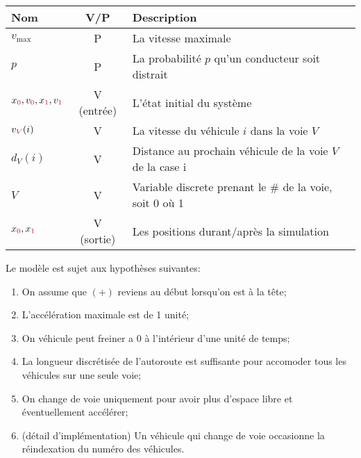 \documentclass[12pt,leqno]{article}
\newcommand\modif{\color{purple}}
\begin{document}
\begin{table}[h]
    \centering
    \begin{tabular}{|l|c|l|}\hline
        Nom &V/P &Description\\\hline
        $v_{\max}$ &P &La vitesse maximale\\\hline
        $p$ &P &La probabilit\'e $p$ qu'un conducteur soit distrait\\\hline
        $x_{\modif 0},v_{\modif 0},x_{\modif 1},v_{\modif 1}$ &V (entr\'ee) &L'\'etat initial du syst\`eme\\\hline
        $v_{\modif V}(i)$ &V &La vitesse du v\'ehicule $i$ {\modif dans la voie $V$}\\\hline
        \modif $d_V(i)$ &V\modif  &\modif Distance au prochain v\'ehicule de la voie $V$ de la case i\\\hline
        \modif $V$ &\modif V &\modif Variable discrete prenant le \# de la voie, soit 0 o\`u 1\footnotemark\\\hline
        $x_{\modif 0},x_{\modif 1}$ &V (sortie) &Les positions durant/apr\`es la simulation\\\hline
    \end{tabular}
\end{table}

\noindent
Le mod\`ele est sujet aux hypoth\`eses suivantes:
\begin{enumerate}
    \item On assume que $(+)$ reviens au d\'ebut lorsqu'on est \`a la t\^ete;
    \item L'acc\'el\'eration maximale est de 1 unit\'e;
    \item On v\'ehicule peut freiner a 0 \`a l'int\'erieur d'une unit\'e de temps;
    \modif\item La longueur discr\'etis\'ee de l'autoroute est suffisante pour accomoder tous les v\'ehicules sur une seule voie;
    \modif\item On change de voie uniquement pour avoir plus d'espace libre et \'eventuellement acc\'el\'erer;
    \modif\item (d\'etail d'impl\'ementation) Un v\'ehicule qui change de voie occasionne la r\'eindexation du num\'ero des v\'ehicules.
\end{enumerate}
\end{document}
